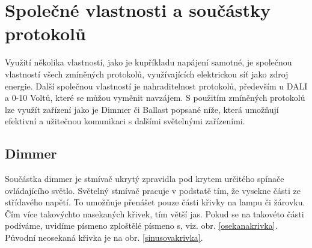 \documentclass[FM,RP]{tulthesis}
\begin{document}
 \section{Společné vlastnosti a součástky protokolů }
 Využití několika vlastností, jako je kupříkladu napájení samotné, je společnou vlastností všech zmíněných protokolů, využívajících elektrickou síť jako zdroj energie. Další společnou vlastností je nahraditelnost protokolů, především u DALI a 0-10 Voltů, které se můžou vyměnit navzájem. S použitím zmíněných protokolů lze využít zařízení jako je Dimmer či Ballast popsané níže, která umožňují efektivní a užitečnou komunikaci s dalšími světelnými zařízeními. 
  
  \subsection{Dimmer}
  Součástka dimmer je stmívač ukrytý zpravidla pod krytem určitého spínače ovládajícího světlo. Světelný stmívač pracuje v podstatě tím, že vysekne části ze střídavého napětí. To umožňuje přenášet pouze části křivky na lampu či žárovku. Čím více takovýchto nasekaných křivek, tím větší jas. Pokud se na takovéto části  podíváme, uvidíme písmeno zploštělé písmeno s, viz. obr. \ref{osekanakrivka}.
  Původní neosekaná křivka je na obr. \ref{sinusovakrivka}.  
  
\end{document}
